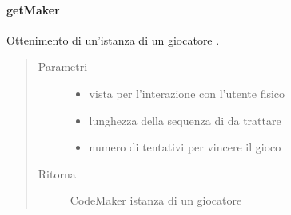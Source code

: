 \documentclass[letterpaper,10pt,italian,openany,oneside]{sphinxmanual}
\begin{document}
\paragraph{getMaker}
\label{\detokenize{source/it/unicam/cs/pa/mastermind/factories/MakerFactory:getmaker}}

\begin{fulllineitems}
\label{\detokenize{source/it/unicam/cs/pa/mastermind/factories/MakerFactory:it.unicam.cs.pa.mastermind.factories.MakerFactory.getMaker(GameView, int, int)}}
Ottenimento di un’istanza di un giocatore .
\begin{quote}\begin{description}
\item[{Parametri}] \leavevmode\begin{itemize}
\item {} 
 \textendash{} vista per l’interazione con l’utente fisico

\item {} 
 \textendash{} lunghezza della sequenza di  da trattare

\item {} 
 \textendash{} numero di tentativi per vincere il gioco

\end{itemize}

\item[{Ritorna}] \leavevmode
CodeMaker istanza di un giocatore 

\end{description}\end{quote}

\end{fulllineitems}
\end{document}
